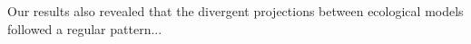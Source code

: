 \documentclass[11pt,letter]{article}
\begin{document}

Our results also revealed that the divergent projections between ecological models followed a regular pattern... 

\end{document}
